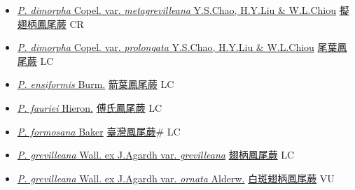\begin{itemize}
\begin{itemize}
        \item[] \href{http://www.theplantlist.org/tpl1.1/search?q=Pteris+dimorpha+var.+metagrevilleana}{\textit{P. dimorpha} Copel. var. \textit{metagrevilleana} Y.S.Chao, H.Y.Liu \& W.L.Chiou}   \href{\detokenize{http://taibnet.sinica.edu.tw/chi/taibnet_species_list.php?T2=擬翅柄鳳尾蕨&T2_new_value=true&fr=y}}{擬翅柄鳳尾蕨} CR
        \item[] \href{http://www.theplantlist.org/tpl1.1/search?q=Pteris+dimorpha+var.+prolongata}{\textit{P. dimorpha} Copel. var. \textit{prolongata} Y.S.Chao, H.Y.Liu \& W.L.Chiou}   \href{\detokenize{http://taibnet.sinica.edu.tw/chi/taibnet_species_list.php?T2=尾葉鳳尾蕨&T2_new_value=true&fr=y}}{尾葉鳳尾蕨} LC
        \item[] \href{http://www.theplantlist.org/tpl1.1/search?q=Pteris+ensiformis}{\textit{P. ensiformis} Burm.}   \href{\detokenize{http://taibnet.sinica.edu.tw/chi/taibnet_species_list.php?T2=箭葉鳳尾蕨&T2_new_value=true&fr=y}}{箭葉鳳尾蕨} LC
        \item[] \href{http://www.theplantlist.org/tpl1.1/search?q=Pteris+fauriei}{\textit{P. fauriei} Hieron.}   \href{\detokenize{http://taibnet.sinica.edu.tw/chi/taibnet_species_list.php?T2=傅氏鳳尾蕨&T2_new_value=true&fr=y}}{傅氏鳳尾蕨} LC
        \item[] \href{http://www.theplantlist.org/tpl1.1/search?q=Pteris+formosana}{\textit{P. formosana} Baker}   \href{\detokenize{http://taibnet.sinica.edu.tw/chi/taibnet_species_list.php?T2=臺灣鳳尾蕨&T2_new_value=true&fr=y}}{臺灣鳳尾蕨}\# LC
        \item[] \href{http://www.theplantlist.org/tpl1.1/search?q=Pteris+grevilleana+var.+grevilleana}{\textit{P. grevilleana} Wall. ex J.Agardh var. \textit{grevilleana}}   \href{\detokenize{http://taibnet.sinica.edu.tw/chi/taibnet_species_list.php?T2=翅柄鳳尾蕨&T2_new_value=true&fr=y}}{翅柄鳳尾蕨} LC
        \item[] \href{http://www.theplantlist.org/tpl1.1/search?q=Pteris+grevilleana+var.+ornata}{\textit{P. grevilleana} Wall. ex J.Agardh var. \textit{ornata} Alderw.}   \href{\detokenize{http://taibnet.sinica.edu.tw/chi/taibnet_species_list.php?T2=白斑翅柄鳳尾蕨&T2_new_value=true&fr=y}}{白斑翅柄鳳尾蕨} VU

\end{itemize}
\end{itemize}
